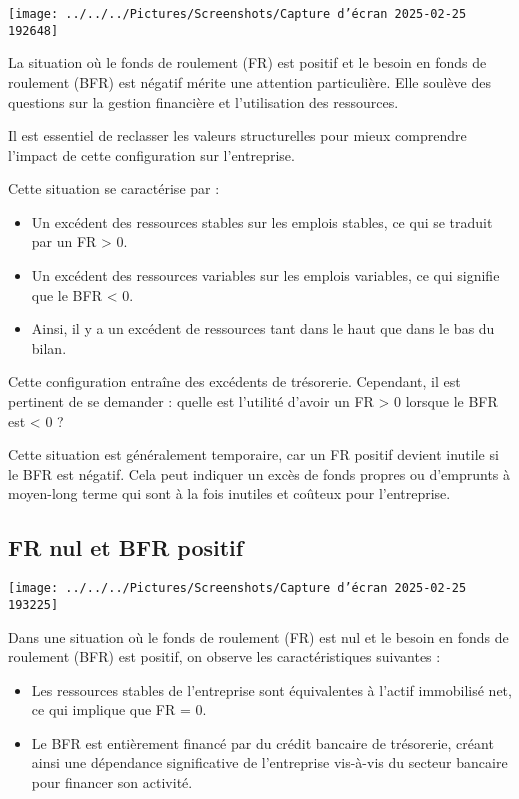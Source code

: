 \documentclass[a4paper, 12pt]{report}
\begin{document}
\begin{center}
	\texttt{[image: ../../../Pictures/Screenshots/Capture d'écran 2025-02-25 192648]}
\end{center}

La situation où le fonds de roulement (FR) est positif et le besoin en fonds de roulement (BFR) est négatif mérite une attention particulière. Elle soulève des questions sur la gestion financière et l'utilisation des ressources.

Il est essentiel de reclasser les valeurs structurelles pour mieux comprendre l'impact de cette configuration sur l'entreprise.

Cette situation se caractérise par :

\begin{itemize}
	\item Un excédent des ressources stables sur les emplois stables, ce qui se traduit par un FR > 0.
	\item Un excédent des ressources variables sur les emplois variables, ce qui signifie que le BFR < 0.
	\item Ainsi, il y a un excédent de ressources tant dans le haut que dans le bas du bilan.
\end{itemize}

Cette configuration entraîne des excédents de trésorerie. Cependant, il est pertinent de se demander : quelle est l'utilité d'avoir un FR > 0 lorsque le BFR est < 0 ?

Cette situation est généralement temporaire, car un FR positif devient inutile si le BFR est négatif. Cela peut indiquer un excès de fonds propres ou d'emprunts à moyen-long terme qui sont à la fois inutiles et coûteux pour l'entreprise.

\subsection{FR nul et BFR positif}
	
\begin{center}
	\texttt{[image: ../../../Pictures/Screenshots/Capture d'écran 2025-02-25 193225]}
\end{center}

Dans une situation où le fonds de roulement (FR) est nul et le besoin en fonds de roulement (BFR) est positif, on observe les caractéristiques suivantes :
	
	\begin{itemize}
		\item Les ressources stables de l'entreprise sont équivalentes à l'actif immobilisé net, ce qui implique que FR = 0.
		\item Le BFR est entièrement financé par du crédit bancaire de trésorerie, créant ainsi une dépendance significative de l'entreprise vis-à-vis du secteur bancaire pour financer son activité.
	\end{itemize}
	
\end{document}

